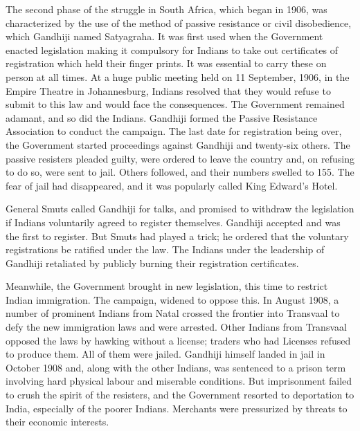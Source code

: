 \begin{multicols}{2}
The second phase of the struggle in South Africa, which began in 1906, was characterized by the use of the method of passive resistance or civil disobedience, which Gandhiji named Satyagraha. It was first used when the Government enacted legislation making it compulsory for Indians to take out certificates of registration which held their finger prints. It was essential to carry these on person at all times. At a huge public meeting held on 11 September, 1906, in the Empire Theatre in Johannesburg, Indians resolved that they would refuse to submit to this law and would face the consequences. The Government remained adamant, and so did the Indians. Gandhiji formed the Passive Resistance Association to conduct the campaign. The last date for registration being over, the Government started proceedings against Gandhiji and twenty-six others. The passive resisters pleaded guilty, were ordered to leave the country and, on refusing to do so, were sent to jail. Others followed, and their numbers swelled to 155. The fear of jail had disappeared, and it was popularly called King Edward's Hotel.

General Smuts called Gandhiji for talks, and promised to withdraw the legislation if Indians voluntarily agreed to register themselves. Gandhiji accepted and was the first to register. But Smuts had played a trick; he ordered that the voluntary registrations be ratified under the law. The Indians under the leadership of Gandhiji retaliated by publicly burning their registration certificates.

Meanwhile, the Government brought in new legislation, this time to restrict Indian immigration. The campaign, widened to oppose this. In August 1908, a number of prominent Indians from Natal crossed the frontier into Transvaal to defy the new immigration laws and were arrested. Other Indians from Transvaal opposed the laws by hawking without a license; traders who had Licenses refused to produce them. All of them were jailed. Gandhiji himself landed in jail in October 1908 and, along with the other Indians, was sentenced to a prison term involving hard physical labour and miserable conditions. But imprisonment failed to crush the spirit of the resisters, and the Government resorted to deportation to India, especially of the poorer Indians. Merchants were pressurized by threats to their economic interests.


\end{multicols}
